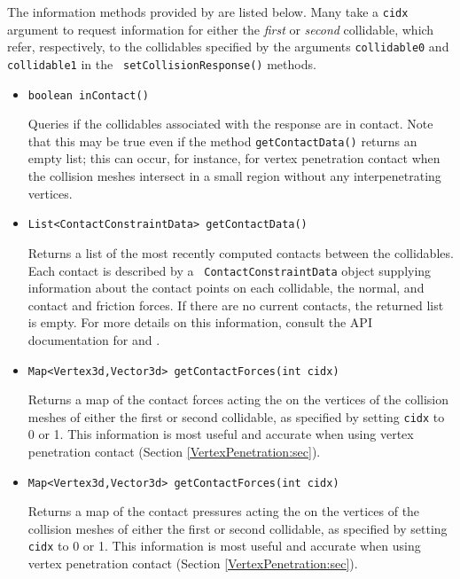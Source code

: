 The information methods provided by 
are listed below. Many take a {\tt cidx} argument to request
information for either the {\it first} or {\it second} collidable,
which refer, respectively, to the collidables specified by the
arguments {\tt collidable0} and {\tt collidable1} in the {\tt
setCollisionResponse()} methods.

\begin{itemize}

\item {\tt boolean inContact()}

Queries if the collidables associated with the response are in
contact.  Note that this may be true even if the method {\tt getContactData()}
returns an empty list; this can occur, for instance, for vertex
penetration contact when the collision meshes intersect in a small
region without any interpenetrating vertices.

\item {\tt List<ContactConstraintData> getContactData()}

Returns a list of the most recently computed contacts between the
collidables. Each contact is described by a {\tt
ContactConstraintData} object supplying information about the contact
points on each collidable, the normal, and contact and friction
forces.  If there are no current contacts, the returned list is empty.
For more details on this information, consult the API documentation
for
 and
.

\item {\tt Map<Vertex3d,Vector3d> getContactForces(int cidx)}

Returns a map of the contact forces acting the on the vertices of the
collision meshes of either the first or second collidable, as
specified by setting {\tt cidx} to 0 or 1. This information is most
useful and accurate when using vertex penetration contact
(Section \ref{VertexPenetration:sec}).

\item {\tt Map<Vertex3d,Vector3d> getContactForces(int cidx)}

Returns a map of the contact pressures acting the on the vertices of
the collision meshes of either the first or second collidable, as
specified by setting {\tt cidx} to 0 or 1.  This information is most
useful and accurate when using vertex penetration contact
(Section \ref{VertexPenetration:sec}).


\end{itemize}
